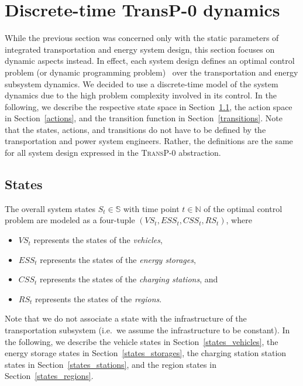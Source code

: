 \section{Discrete-time \textbf{TransP-0} dynamics}
\label{dynamics}

While the previous section was concerned only with the static parameters of integrated transportation and energy system design, this section focuses on dynamic aspects instead. In effect, each system design defines an optimal control problem (or dynamic programming problem)~\cite{Bertsekas1995} over the transportation and energy subsystem dynamics. We decided to use a discrete-time model of the system dynamics due to the high problem complexity involved in its control. In the following, we describe the respective state space in Section~\ref{states}, the action space in Section~\ref{actions}, and the transition function in Section~\ref{transitions}. Note that the states, actions, and transitions do not have to be defined by the transportation and power system engineers. Rather, the definitions are the same for all system design expressed in the \textsc{TransP-0} abstraction.

\subsection{States}
\label{states}

The overall system states $S_t \in \mathbb{S}$ with time point $t \in \mathbb{N}$ of the optimal control problem are modeled as a four-tuple $(VS_t, ESS_t, CSS_t, RS_t)$, where
\begin{itemize}
	\item $VS_t$ represents the states of the \textit{vehicles},
	\item $ESS_t$ represents the states of the \textit{energy storages},
	\item $CSS_t$ represents the states of the \textit{charging stations}, and
	\item $RS_t$ represents the states of the \textit{regions}.
\end{itemize}
Note that we do not associate a state with the infrastructure of the transportation subsystem (i.e.\ we assume the infrastructure to be constant). In the following, we describe the vehicle states in Section~\ref{states_vehicles}, the energy storage states in Section~\ref{states_storages}, the charging station station states in Section~\ref{states_stations}, and the region states in Section~\ref{states_regions}.

